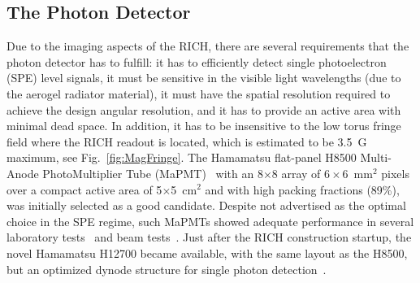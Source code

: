 \documentclass[5p,times,twocolumn]{elsarticle}
\def\MaPMT{MaPMT }
\begin{document}
\subsection{The Photon Detector}

Due to the imaging aspects of the RICH, there are several requirements that the photon detector has to fulfill: it has
to efficiently detect single photoelectron (SPE) level signals, it must be sensitive in the visible light wavelengths (due
to the aerogel radiator material), it must have the spatial resolution required to achieve the design angular resolution,
and it has to provide an active area with minimal dead space. In addition, it has to be insensitive to the low torus fringe
field where the RICH readout is located, which is estimated to be 3.5~G maximum, see Fig.~\ref{fig:MagFringe}.
The Hamamatsu flat-panel H8500 Multi-Anode PhotoMultiplier Tube (MaPMT)~\cite{Ref:H8500} with an 8$\times$8
array of $6 \times 6$~mm$^2$ pixels over a compact active area of 5$\times$5~cm$^2$ and with high packing
fractions (89\%), was initially selected as a good candidate.
Despite not advertised as the optimal choice in the SPE regime, such MaPMTs showed adequate performance in several
laboratory tests~\cite{REF:MaPMT_test} and beam tests~\cite{REF:RICH_CERN}.
Just after the RICH construction startup, the novel Hamamatsu H12700 became available, with the same layout as
the H8500, but an optimized dynode structure for single photon detection~\cite{Ref:H12700}.
\end{document}
